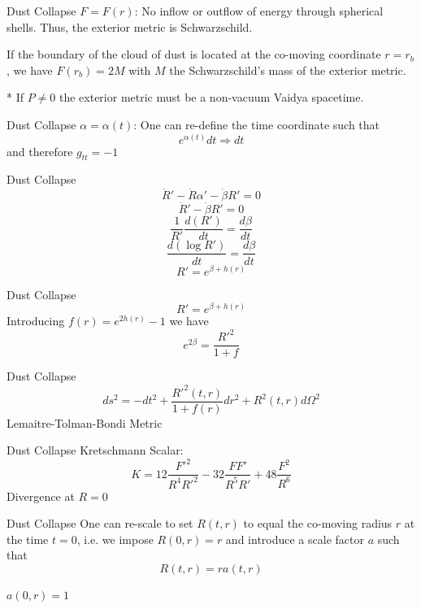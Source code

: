 \documentclass{beamer}
\begin{document}
\begin{darkframes}
\begin{frame}{Dust Collapse}
	$F = F(r)$: No inflow or outflow of energy through spherical shells. Thus, the exterior metric is Schwarzschild.
    \bigskip
    
    \pause
    If the boundary of the cloud of dust is located at the co-moving coordinate $r=r_b$, we have $F(r_b) = 2M$ with $M$ the Schwarzschild's mass of the exterior metric.
    \bigskip
    
    \pause
    \footnotesize
    * If $P\neq0$ the exterior metric must be a non-vacuum Vaidya spacetime.
\end{frame}

\begin{frame}{Dust Collapse}
    $\alpha = \alpha(t)$: One can re-define the time coordinate such that
    $$  e^{\alpha(t)} dt \Rightarrow dt$$
    and therefore $g_{tt} = -1$
\end{frame}

\begin{frame}{Dust Collapse}
    $$\dot{R}'-\dot{R} \alpha'-\dot{\beta} R' = 0$$
    \pause
    $$\dot{R}'-\dot{\beta} R' =0$$
    \pause
    $$\frac{1}{R'} \frac{d(R')}{dt} = \frac{d\beta}{dt}$$
    \pause
    $$\frac{d(\log R')}{dt} = \frac{d\beta}{dt}$$
    \pause
    $$R' = e^{\beta + h(r)}$$
\end{frame}

\begin{frame}{Dust Collapse}
    $$R' = e^{\beta + h(r)}$$
    \pause
    Introducing $f(r) = e^{2h(r)} - 1$ we have
    $$ e^{2\beta} = \frac{R'^2}{1+f}$$
\end{frame}

\begin{frame}{Dust Collapse}
    $$ds^2 = -dt^2 + \frac{R'^2(t,r)}{1+f(r)} dr^2 + R^2(t,r) d\Omega^2 $$
    \centering
    Lemaitre-Tolman-Bondi Metric
\end{frame}

\begin{frame}{Dust Collapse}
    Kretschmann Scalar:
    $$K = 12\frac{F'^2}{R^4 R'^2} - 32\frac{FF'}{R^5 R'} + 48 \frac{F^2}{R^6}$$
    \pause
    Divergence at $R=0$
\end{frame}

\begin{frame}{Dust Collapse}
    One can re-scale to set $R(t,r)$ to equal the co-moving radius $r$ at the time $t=0$, i.e. we impose $R(0,r)=r$ and introduce a scale factor $a$ such that
    $$R(t,r) = r a(t,r)$$

	$a(0,r) = 1$\\
    \pause
    

\end{frame}
\end{darkframes}
\end{document}
